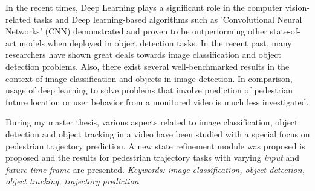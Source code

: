 % 
% 
%

In the recent times, Deep Learning plays a significant role in the computer vision-related tasks and Deep learning-based algorithms such as 'Convolutional Neural Networks'
(CNN) demonstrated and proven to be outperforming other state-of-art models when 
deployed in object detection tasks. In the recent past, many researchers have shown great 
deals towards image classification and object detection problems. Also, there exist several 
well-benchmarked results in the context of image classification and objects in image detection.
In comparison, usage of deep learning to solve problems that involve prediction of pedestrian future location or user behavior from a monitored video is much less investigated.

\vspace{1em}
\noindent During my master thesis, various aspects related to image classification, object 
detection and object tracking in a video have been studied with a special focus on pedestrian trajectory prediction. 
A new state refinement module was proposed is proposed and the results for pedestrian trajectory 
tasks with varying \textit{input} and \textit{future-time-frame} are presented.
\baselineskip
\textit{Keywords: image classification, object detection, object tracking, trajectory prediction}
